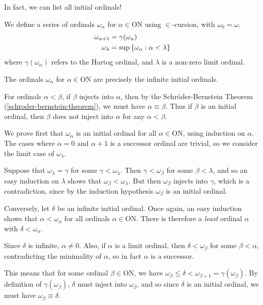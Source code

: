 \documentclass{article}
\begin{document}
In fact, we can list all initial ordinals!

\begin{definition}
    We define a series of ordinals $\omega_\alpha$ for $\alpha \in \mathrm{ON}$ using $\in$-cursion, with $\omega_0 = \omega$.
    \begin{align*}
	    \omega_{\alpha + 1} &= \gamma(\omega_\alpha) \\
	    \omega_{\lambda} &= \sup \left\lbrace \omega_\alpha : \alpha < \lambda \right\rbrace
	\end{align*}
	where $\gamma(\omega_\alpha)$ refers to the Hartog ordinal, and $\lambda$ is a non-zero limit ordinal.
\end{definition}

\begin{proposition}
    The ordinals $\omega_\alpha$ for $\alpha \in \mathrm{ON}$ are precisely the infinite initial ordinals.
\end{proposition}

\begin{prf}
    For ordinals $\alpha < \beta$, if $\beta$ injects into $\alpha$, then by the Schr\"oder-Bernstein Theorem (\ref{schroder-bernstein-theorem}), we must have $\alpha \equiv \beta$. Thus if $\beta$ is an initial ordinal, then $\beta$ does not inject into $\alpha$ for any $\alpha < \beta$.
    
    We prove first that $\omega_\alpha$ is an initial ordinal for all $\alpha \in \mathrm{ON}$, using induction on $\alpha$. The cases where $\alpha = 0$ and $\alpha+1$ is a successor ordinal are trivial, so we consider the limit case of $\omega_\lambda$.
    
    Suppose that $\omega_\lambda = \gamma$ for some $\gamma < \omega_\lambda$. Then $\gamma < \omega_\beta$ for some $\beta < \lambda$, and so an easy induction on $\lambda$ shows that $\omega_\beta < \omega_\lambda$. But then $\omega_\beta$ injects into $\gamma$, which is a contradiction, since by the induction hypothesis $\omega_\beta$ is an initial ordinal.
    
    Conversely, let $\delta$ be an infinite initial ordinal. Once again, an easy induction shows that $\alpha < \omega_\alpha$ for all ordinals $\alpha \in \mathrm{ON}$. There is therefore a \textit{least} ordinal $\alpha$ with $\delta < \omega_\alpha$.
    
    Since $\delta$ is infinite, $\alpha \neq 0$. Also, if $\alpha$ is a limit ordinal, then $\delta < \omega_\beta$ for some $\beta < \alpha$, contradicting the minimality of $\alpha$, so in fact $\alpha$ is a successor.
    
    This means that for some ordinal $\beta \in \mathrm{ON}$, we have $\omega_\beta \leq \delta < \omega_{\beta + 1} = \gamma(\omega_\beta)$. By definition of $\gamma(\omega_\beta)$, $\delta$ must inject into $\omega_\beta$, and so since $\delta$ is an initial ordinal, we must have $\omega_\beta \equiv \delta$.
\end{prf}
\end{document}
